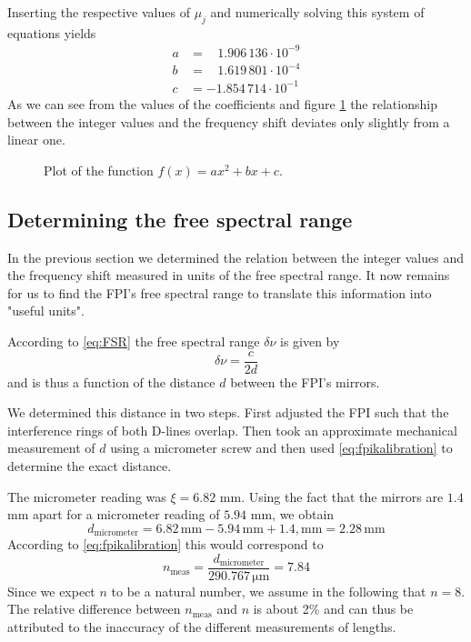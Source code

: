 Inserting the respective values of $\mu_j$ and numerically solving this system of equations yields
\begin{align}
	a&=\;\;\,\,1.906\,136\cdot 10^{-9}\\
	b&=\;\;\,\,1.619\,801\cdot 10^{-4}\\
	c&=-1.854\,714 \cdot 10^{-1}
\end{align}
As we can see from the values of the coefficients and figure \ref{fig:korrekturfunktion} the relationship between the integer values and the frequency shift deviates only slightly from a linear one.
\begin{figure}[H]
	\centering
	\hspace*{-.5cm}
	\caption{Plot of the function $f(x)=ax^2+bx+c$.}
	\label{fig:korrekturfunktion}
\end{figure}
\subsection{Determining the free spectral range}
In the previous section we determined the relation between the integer values and the frequency shift measured in units of the free spectral range. It now remains for us to find the FPI's free spectral range to translate this information into "useful units".

According to \eqref{eq:FSR} the free spectral range $\delta\nu$ is given by
\begin{equation}
	\delta\nu = \frac{c}{2d}
\end{equation}
and is thus a function of the distance $d$ between the FPI's mirrors.

We determined this distance in two steps. First adjusted the FPI such that the interference rings of both D-lines overlap. Then took an approximate mechanical measurement of $d$ using a micrometer screw and then used \eqref{eq:fpikalibration} to determine the exact distance.

The micrometer reading was $\xi=6.82$ mm. Using the fact that the mirrors are $1.4$ mm apart for a micrometer reading of $5.94$ mm, we obtain
\begin{equation}
	d_{\text{micrometer}}=6.82 \, \si{\milli\metre}-5.94\, \si{\milli\metre}+1.4,\si{\milli\metre}=2.28 \,\si{\milli\metre}
\end{equation} 
According to \eqref{eq:fpikalibration} this would correspond to
\begin{equation}
	n_{\text{meas}}=\frac{d_{\text{micrometer}}}{290.767 \,\si{\micro\metre}}=7.84
\end{equation}
Since we expect $n$ to be a natural number, we assume in the following that $n=8$. The relative difference between $n_{\text{meas}}$ and $n$ is about 2\% and can thus be attributed to the inaccuracy of the different measurements of lengths.

